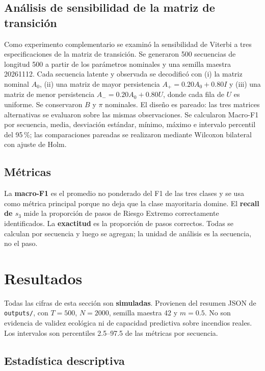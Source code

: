 \documentclass[11pt,letterpaper]{article}
\begin{document}
\subsection{Análisis de sensibilidad de la matriz de transición}

Como experimento complementario se examinó la sensibilidad de Viterbi a tres especificaciones de la matriz de transición. Se generaron 500 secuencias de longitud 500 a partir de los parámetros nominales y una semilla maestra 20261112. Cada secuencia latente y observada se decodificó con (i) la matriz nominal $A_0$, (ii) una matriz de mayor persistencia $A_{+}=0.20A_0+0.80I$ y (iii) una matriz de menor persistencia $A_{-}=0.20A_0+0.80U$, donde cada fila de $U$ es uniforme. Se conservaron $B$ y $\pi$ nominales. El diseño es pareado: las tres matrices alternativas se evaluaron sobre las mismas observaciones. Se calcularon Macro-F1 por secuencia, media, desviación estándar, mínimo, máximo e intervalo percentil del 95\,\%; las comparaciones pareadas se realizaron mediante Wilcoxon bilateral con ajuste de Holm.

\subsection{Métricas}

La \textbf{macro-F1} es el promedio no ponderado del F1 de las tres clases y se usa como métrica principal porque no deja que la clase mayoritaria domine. El \textbf{recall de \(s_3\)} mide la proporción de pasos de Riesgo Extremo correctamente identificados. La \textbf{exactitud} es la proporción de pasos correctos. Todas se calculan por secuencia y luego se agregan; la unidad de análisis es la secuencia, no el paso.

\section{Resultados}

Todas las cifras de esta sección son \textbf{simuladas}. Provienen del resumen JSON de \texttt{outputs/}, con \(T=500\), \(N=2000\), semilla maestra 42 y \(m=0.5\). No son evidencia de validez ecológica ni de capacidad predictiva sobre incendios reales. Los intervalos son percentiles 2.5--97.5 de las métricas por secuencia.

\subsection{Estadística descriptiva}
\end{document}
